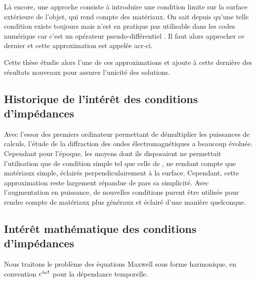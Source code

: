 Là encore, une approche consiste à introduire une condition limite sur la surface extérieure de l'objet, qui rend compte des matériaux. On sait depuis \cite{cessenat_mathematical_1996} qu'une telle condition existe toujours mais n'est en pratique pas utilisable dans les codes numérique car c'est un opérateur pseudo-différentiel . Il faut alors approcher ce dernier et cette approximation est appelée \gls{acr-ci}. 

Cette thèse étudie alors l'une de ces approximations et ajoute à cette dernière des résultats nouveaux pour assurer l'unicité des solutions.

\subsection*{Historique de l’intérêt des conditions d'impédances}


Avec l'essor des premiers ordinateur permettant de démultiplier les puissances de calculs, l'étude de la diffraction des ondes électromagnétiques a beaucoup évoluée. Cependant pour l'époque, les moyens dont ils disposaient ne permettait l'utilisation que de condition simple tel que celle de \cite{leontovich_investigations_1948}, ne rendant compte que matériaux simple, éclairés perpendiculairement à la surface. Cependant, cette approximation reste largement répandue de pars sa simplicité. Avec l'augmentation en puissance, de nouvelles conditions purent être utilisée %
pour rendre compte de matériaux plus généraux et éclairé d'une manière quelconque.

\subsection*{Intérêt mathématique des conditions d'impédances}
Nous traitons le problème des équations Maxwell sous forme harmonique, en convention $e^{i\omega t}$ pour la dépendance temporelle.


